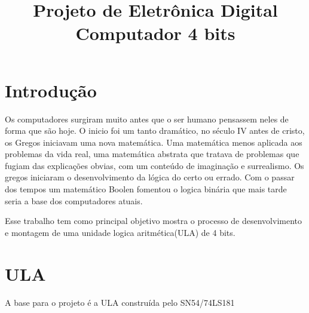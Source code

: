 \documentclass[a4paper, 11pt]{article}
\title{Projeto de Eletrônica Digital\\Computador 4 bits}
\begin{document}
\maketitle

%
%



\newpage

\section{Introdução}

Os computadores surgiram muito antes que o ser humano pensassem neles 
de forma que são hoje. O inicio foi um tanto dramático, no século IV 
antes de cristo, os Gregos iniciavam uma nova matemática. Uma matemática
menos aplicada aos problemas da vida real, uma matemática abstrata que
tratava de problemas que fugiam das explicações obvias, com um conteúdo
de imaginação e surrealismo. Os gregos iniciaram o desenvolvimento da
lógica do certo ou errado. Com o passar dos tempos um matemático
Boolen fomentou o logica binária que mais tarde seria a base dos computadores
atuais. 

Esse trabalho tem como principal objetivo mostra o processo de desenvolvimento
e montagem de uma unidade logica aritmética(ULA) de 4 bits. 

% 
\newpage

\section{ULA}

A base para o projeto é a ULA construída pelo SN54/74LS181
\end{document}

